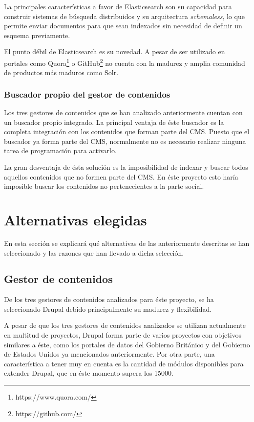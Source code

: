 La principales características a favor de Elasticsearch son su capacidad para construir sistemas de búsqueda distribuidos y su arquitectura \textit{schemaless}, lo que permite enviar documentos para que sean indexados sin necesidad de definir un esquema previamente.

El punto débil de Elasticsearch es su novedad. A pesar de ser utilizado en portales como Quora\footnote{https://www.quora.com/} o GitHub\footnote{https://github.com/} no cuenta con la madurez y amplia comunidad de productos más maduros como Solr.


\subsubsection{Buscador propio del gestor de contenidos}
Los tres gestores de contenidos que se han analizado anteriormente cuentan con un buscador propio integrado.  La principal ventaja de éste buscador es la completa integración con los contenidos que forman parte del CMS.  Puesto que el buscador ya forma parte del CMS, normalmente no es necesario realizar ninguna tarea de programación para activarlo.

La gran desventaja de ésta solución es la imposibilidad de indexar y buscar todos aquellos contenidos que no formen parte del CMS.  En éste proyecto esto haría imposible buscar los contenidos no pertenecientes a la parte social.



\section{Alternativas elegidas}
\label{chapter02:alternativas_seleccionadas}
En esta sección se explicará qué alternativas de las anteriormente descritas se han seleccionado y las razones que han llevado a dicha selección.

\subsection{Gestor de contenidos}
De los tres gestores de contenidos analizados para éste proyecto, se ha seleccionado Drupal debido principalmente su madurez y flexibilidad.

A pesar de que los tres gestores de contenidos analizados se utilizan actualmente en multitud de proyectos, Drupal forma parte de varios proyectos con objetivos similares a éste, como los portales de datos del Gobierno Británico y del Gobierno de Estados Unidos ya mencionados anteriormente. Por otra parte, una característica a tener muy en cuenta es la cantidad de módulos disponibles para extender Drupal, que en éste momento supera los 15000.

